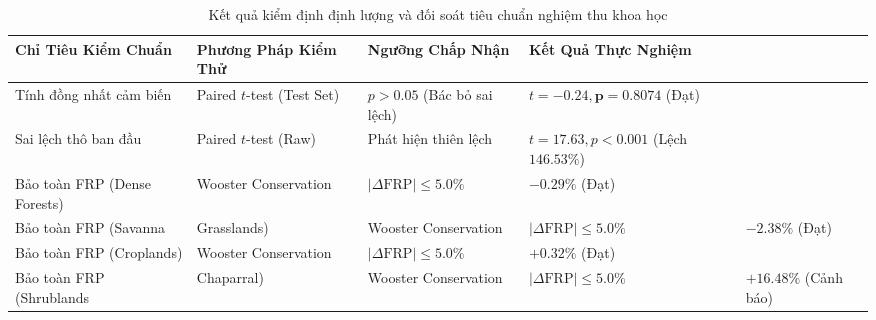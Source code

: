 
\begin{table}[htbp]
    \centering
    \small
    \renewcommand{\arraystretch}{1.0}
    \caption{Kết quả kiểm định định lượng và đối soát tiêu chuẩn nghiệm thu khoa học}
    \label{tab:acceptance_benchmarks}
    \vspace{0.2em}
    \setlength{\tabcolsep}{5pt}
    \begin{tabular}{@{}p{3.8cm}p{3.2cm}p{3.6cm}p{4.2cm}@{}}
        \toprule
        \textbf{Chỉ Tiêu Kiểm Chuẩn} & \textbf{Phương Pháp Kiểm Thử} & \textbf{Ngưỡng Chấp Nhận} & \textbf{Kết Quả Thực Nghiệm} \\
        \midrule
        Tính đồng nhất cảm biến & Paired $t$-test (Test Set) & $p > 0.05$ (Bác bỏ sai lệch) & $t = -0.24, \mathbf{p = 0.8074}$ (Đạt) \\
        Sai lệch thô ban đầu & Paired $t$-test (Raw) & Phát hiện thiên lệch & $t = 17.63, p < 0.001$ (Lệch $146.53\%$) \\
        Bảo toàn FRP (Dense Forests) & Wooster Conservation & $|\Delta\text{FRP}| \le 5.0\%$ & $\mathbf{-0.29\%}$ (Đạt) \\
        Bảo toàn FRP (Savanna & Grasslands) & Wooster Conservation & $|\Delta\text{FRP}| \le 5.0\%$ & $\mathbf{-2.38\%}$ (Đạt) \\
        Bảo toàn FRP (Croplands) & Wooster Conservation & $|\Delta\text{FRP}| \le 5.0\%$ & $\mathbf{+0.32\%}$ (Đạt) \\
        Bảo toàn FRP (Shrublands & Chaparral) & Wooster Conservation & $|\Delta\text{FRP}| \le 5.0\%$ & $\mathbf{+16.48\%}$ (Cảnh báo) \\
        \bottomrule
    \end{tabular}
\end{table}
